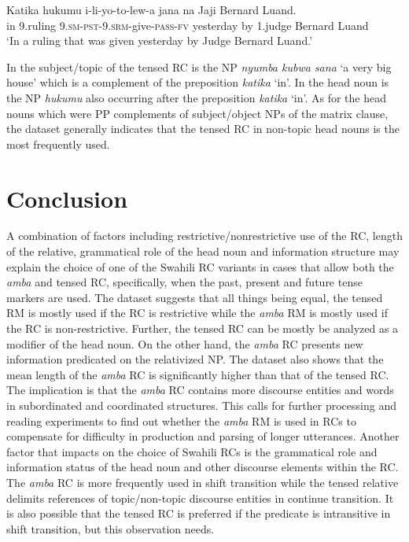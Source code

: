 \documentclass[output=paper,colorlinks,citecolor=brown]{langscibook}
\begin{document}
\ea%
    \label{ex:mwamzandi:32}
    \gll    Katika hukumu i-li-yo-to-lew-a jana na Jaji Bernard Luand.\\
            in 9.ruling \textsc{9.sm-pst-9.srm-}give\textsc{-pass-fv} yesterday by 1.judge Bernard Luand\\
    \glt    ‘In a ruling that was given yesterday by Judge Bernard Luand.’
\z

In  the subject/topic of the tensed RC is the NP \textit{nyumba kubwa sana} ‘a very big house’ which is a complement of the preposition \textit{katika} ‘in’. In  the head noun is the NP \textit{hukumu} also occurring after the preposition \textit{katika} ‘in’. As for the head nouns which were PP complements of subject/object NPs of the matrix clause, the dataset generally indicates that the tensed RC in non-topic head nouns is the most frequently used.

\section{Conclusion}\label{sec:mwamzandi:5}

A combination of factors including restrictive/nonrestrictive use of the RC, length of the relative, grammatical role of the head noun and information structure may explain the choice of one of the Swahili RC variants in cases that allow both the \textit{amba} and tensed RC, specifically, when the past, present and future tense markers are used. The dataset suggests that all things being equal, the tensed RM is mostly used if the RC is restrictive while the \textit{amba} RM is mostly used if the RC is non-restrictive. Further, the tensed RC can be mostly be analyzed as a modifier of the head noun. On the other hand, the \textit{amba} RC presents new information predicated on the relativized NP. The dataset also shows that the mean length of the \textit{amba} RC is significantly higher than that of the tensed RC. The implication is that the \textit{amba} RC contains more discourse entities and words in subordinated and coordinated structures. This calls for further processing and reading experiments to find out whether the \textit{amba} RM is used in RCs to compensate for difficulty in production and parsing of longer utterances. Another factor that impacts on the choice of Swahili RCs is the grammatical role and information status of the head noun and other discourse elements within the RC. The \textit{amba} RC is more frequently used in shift transition while the tensed relative delimits references of topic/non-topic discourse entities in continue transition. It is also possible that the tensed RC is preferred if the predicate is intransitive in shift transition, but this observation needs.
\end{document}
